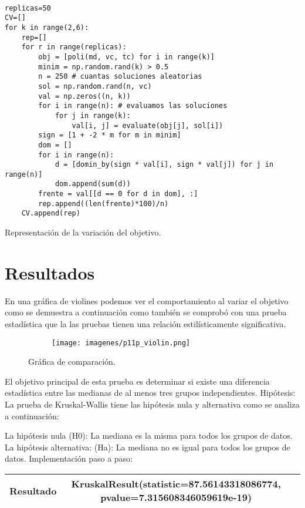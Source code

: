 \documentclass{article}
\begin{document}
\begin{listing}[H]
\begin{verbatim}

replicas=50
CV=[]
for k in range(2,6):
    rep=[]
    for r in range(replicas):
        obj = [poli(md, vc, tc) for i in range(k)]
        minim = np.random.rand(k) > 0.5
        n = 250 # cuantas soluciones aleatorias
        sol = np.random.rand(n, vc)
        val = np.zeros((n, k))
        for i in range(n): # evaluamos las soluciones
            for j in range(k):
                val[i, j] = evaluate(obj[j], sol[i])
        sign = [1 + -2 * m for m in minim]
        dom = []
        for i in range(n):
            d = [domin_by(sign * val[i], sign * val[j]) for j in range(n)]
            dom.append(sum(d)) 
        frente = val[[d == 0 for d in dom], :]
        rep.append((len(frente)*100)/n)
    CV.append(rep)

  \end{verbatim}
  \label{lst:fibo}
  \caption{Representación de la variación del objetivo.}
   \end{listing}


\newpage
\section{Resultados}
En una gráfica de violines podemos ver el comportamiento al variar el objetivo como se demuestra a continuación como también se comprobó con una prueba estadística que la las pruebas tienen una relación estilísticamente significativa.


\begin{figure}[H]
\centering
\begin{subfigure}[b]{.50\linewidth}
\texttt{[image: imagenes/p11p\_violin.png]}
\end{subfigure}
\caption{Gráfica de comparación.}
\label{fig:westminster}
\end{figure}

El objetivo principal de esta prueba es determinar si existe una diferencia estadística entre las medianas de al menos tres grupos independientes.
Hipótesis:
La prueba de Kruskal-Wallis tiene las hipótesis nula y alternativa como se analiza a continuación:

La hipótesis nula (H0): La mediana es la misma para todos los grupos de datos.
La hipótesis alternativa: (Ha): La mediana no es igual para todos los grupos de datos.
Implementación paso a paso:
\begin{center}
\begin{tabular}{ |c|c|c| } 
 \hline
 Resultado & KruskalResult(statistic=87.56143318086774, pvalue=7.315608346059619e-19) \\ 

 \hline
\end{tabular}
\end{center}
\end{document}
